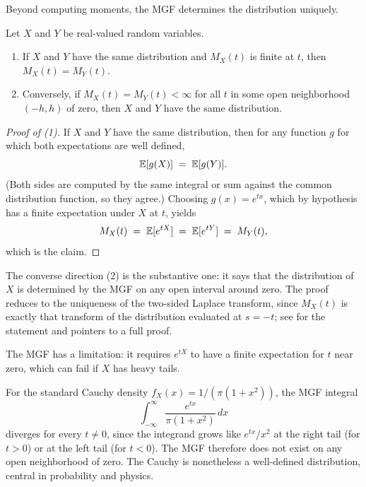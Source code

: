 Beyond computing moments, the MGF determines the distribution uniquely.

\begin{theorem}\label{thm:mgf-uniqueness}
Let \(X\) and \(Y\) be real-valued random variables.
\begin{enumerate}[label=\textnormal{(\arabic*)},leftmargin=*]
  \item If \(X\) and \(Y\) have the same distribution and \(M_X(t)\) is finite at \(t\), then \(M_X(t) = M_Y(t)\).
  \item Conversely, if \(M_X(t) = M_Y(t) < \infty\) for all \(t\) in some open neighborhood \((-h, h)\) of zero, then \(X\) and \(Y\) have the same distribution.
\end{enumerate}
\end{theorem}

\begin{proof}[Proof of (1)]
If \(X\) and \(Y\) have the same distribution, then for any function \(g\) for which both expectations are well defined,
\[
  \mathbb{E}[g(X)] \;=\; \mathbb{E}[g(Y)].
\]
(Both sides are computed by the same integral or sum against the common distribution function, so they agree.) Choosing \(g(x) = e^{tx}\), which by hypothesis has a finite expectation under \(X\) at \(t\), yields
\[
  M_X(t) \;=\; \mathbb{E}[e^{tX}] \;=\; \mathbb{E}[e^{tY}] \;=\; M_Y(t),
\]
which is the claim.
\end{proof}

The converse direction (2) is the substantive one: it says that the distribution of \(X\) is determined by the MGF on any open interval around zero. The proof reduces to the uniqueness of the two-sided Laplace transform, since \(M_X(t)\) is exactly that transform of the distribution evaluated at \(s = -t\); see \citet[][Thm.~2.3.11]{Casella2002} for the statement and pointers to a full proof.

The MGF has a limitation: it requires \(e^{tX}\) to have a finite expectation for \(t\) near zero, which can fail if \(X\) has heavy tails.

\begin{example}\label{ex:cauchy-no-mgf}
For the standard Cauchy density \(f_X(x) = 1 / (\pi (1 + x^2))\), the MGF integral
\[
  \int_{-\infty}^\infty \frac{e^{tx}}{\pi (1 + x^2)}\, dx
\]
diverges for every \(t \ne 0\), since the integrand grows like \(e^{tx}/x^2\) at the right tail (for \(t > 0\)) or at the left tail (for \(t < 0\)). The MGF therefore does not exist on any open neighborhood of zero. The Cauchy is nonetheless a well-defined distribution, central in probability and physics.
\end{example}

